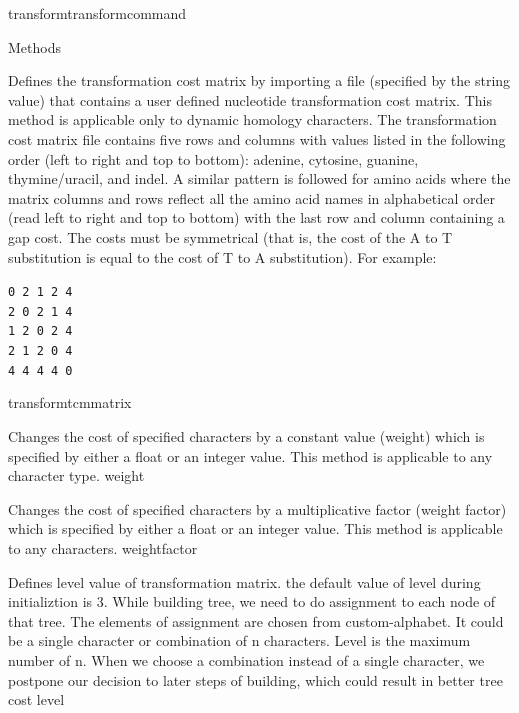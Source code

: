 \begin{command}{transform}{transformcommand}
\begin{arguments}
\begin{argumentgroup}{Methods}
            {Defines the transformation cost matrix by importing a file (specified by
            the string value) that contains a user defined nucleotide
            transformation cost matrix. This method is applicable only to dynamic homology characters.
            The transformation cost matrix file contains five rows and columns
            with values listed in the following order (left to right and top to
            bottom): adenine, cytosine, guanine,
            thymine/uracil, and indel.  A similar pattern is followed for amino acids
            where the matrix columns and rows reflect all the amino acid names in alphabetical order
            (read left to right and top to bottom) with the last row and column containing a gap cost. 
            The costs must be symmetrical (that is, the
            cost of the A to T substitution is equal to the cost of T to A
            substitution). For example:
	        \begin{center}
            \texttt{0 2 1 2 4 \\
            2 0 2 1 4 \\
            1 2 0 2 4 \\
            2 1 2 0 4 \\
            4 4 4 4 0} 
            \end{center}
            }
            {transformtcmmatrix}

            {Changes the cost of specified characters by a
            constant value (weight) which is specified by either a
            float or an integer value. This method is applicable to any character type.} 
            {weight}

            {Changes the cost of specified characters by a
            multiplicative factor (weight factor) which is specified by either a
            float or an integer value. This method is applicable to any characters.} 
            {weightfactor}

            {Defines level value of transformation matrix. the default value of
            level during initializtion is 3. While building tree, we need to
            do assignment to each node of that tree. The elements of assignment
            are chosen from custom-alphabet. It could be a single character or
            combination of n characters.  Level is the maximum number of n.
            When we choose a combination instead of a single character, we
            postpone our decision to later steps of building, which could
            result in better tree cost }
            {level}
        \end{argumentgroup}
         


\end{arguments}
\end{command}
